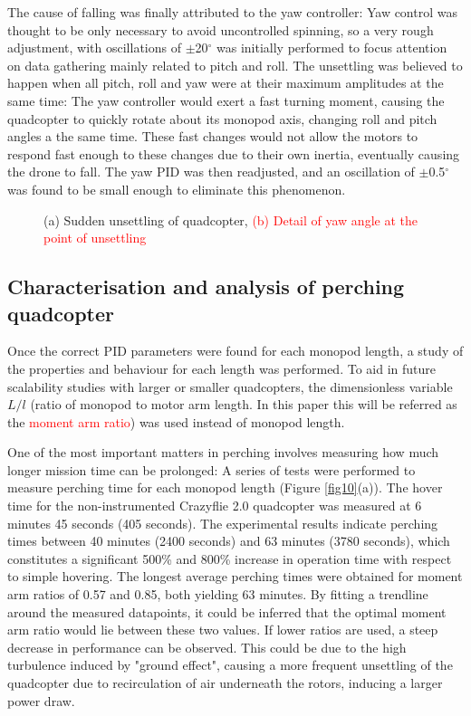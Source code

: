 \documentclass[12pt,a4paper]{article}
\begin{document}
The cause of falling was finally attributed to the yaw controller: Yaw control was thought to be only necessary to avoid uncontrolled spinning, so a very rough adjustment, with oscillations of $\pm$20$^{\circ}$ was initially performed to focus attention on data gathering mainly related to pitch and roll. The unsettling was believed to happen when all pitch, roll and yaw were at their maximum amplitudes at the same time: The yaw controller would exert a fast turning moment, causing the quadcopter to quickly rotate about its monopod axis, changing roll and pitch angles a the same time. These fast changes would not allow the motors to respond fast enough to these changes due to their own inertia, eventually causing the drone to fall. The yaw PID was then readjusted, and an oscillation of $\pm$0.5$^{\circ}$ was found to be small enough to eliminate this phenomenon.


\begin{figure}[h!]
\centering
  \caption{(a) Sudden unsettling of quadcopter, \textcolor{red}{(b) Detail of yaw angle at the point of unsettling }}
  \label{fig9}
\end{figure}



\subsection{Characterisation and analysis of perching quadcopter}
Once the correct PID parameters were found for each monopod length, a study of the properties and behaviour for each length was performed. To aid in future scalability studies with larger or smaller quadcopters, the dimensionless variable $L/l$ (ratio of monopod to motor arm length. In this paper this will be referred as the \textcolor{red}{moment arm ratio}) was used instead of monopod length.

One of the most important matters in perching involves measuring how much longer mission time can be prolonged: A series of tests were performed to measure perching time for each monopod length (Figure \ref{fig10}(a)). The hover time for the non-instrumented Crazyflie 2.0 quadcopter was measured at 6 minutes 45 seconds (405 seconds). The experimental results indicate perching times between 40 minutes (2400 seconds) and 63 minutes (3780 seconds), which constitutes a significant 500\% and 800\% increase in operation time with respect to simple hovering. The longest average perching times were obtained for moment arm ratios of 0.57 and 0.85, both yielding 63 minutes. By fitting a trendline around the measured datapoints, it could be inferred that the optimal moment arm ratio would lie between these two values. If lower ratios are used, a steep decrease in performance can be observed. This could be due to the high turbulence induced by "ground effect", causing a more frequent unsettling of the quadcopter due to recirculation of air underneath the rotors, inducing a larger power draw. 
\end{document}
